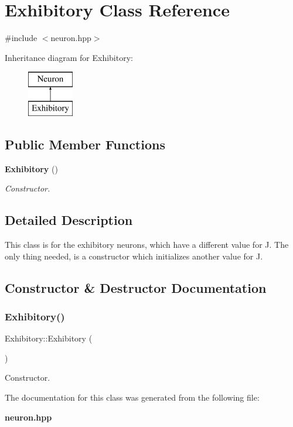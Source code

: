 \section{Exhibitory Class Reference}
\label{class_exhibitory}


{\ttfamily \#include $<$neuron.\+hpp$>$}

Inheritance diagram for Exhibitory\+:\begin{figure}[H]
\begin{center}
\leavevmode
\includegraphics[height=2.000000cm]{class_exhibitory}
\end{center}
\end{figure}
\subsection*{Public Member Functions}
\begin{DoxyCompactItemize}
\item 
\textbf{ Exhibitory} ()
\begin{DoxyCompactList}\small\item\em Constructor. \end{DoxyCompactList}\end{DoxyCompactItemize}


\subsection{Detailed Description}
This class is for the exhibitory neurons, which have a different value for J. The only thing needed, is a constructor which initializes another value for J. 

\subsection{Constructor \& Destructor Documentation}
\mbox{\label{class_exhibitory_a067e5e9bc7881ac3671ec3320cacf7ef}} 
\subsubsection{Exhibitory()}
{\footnotesize\ttfamily Exhibitory\+::\+Exhibitory (\begin{DoxyParamCaption}{ }\end{DoxyParamCaption})\hspace{0.3cm}{\ttfamily [inline]}}



Constructor. 



The documentation for this class was generated from the following file\+:\begin{DoxyCompactItemize}
\item 
\textbf{ neuron.\+hpp}\end{DoxyCompactItemize}
